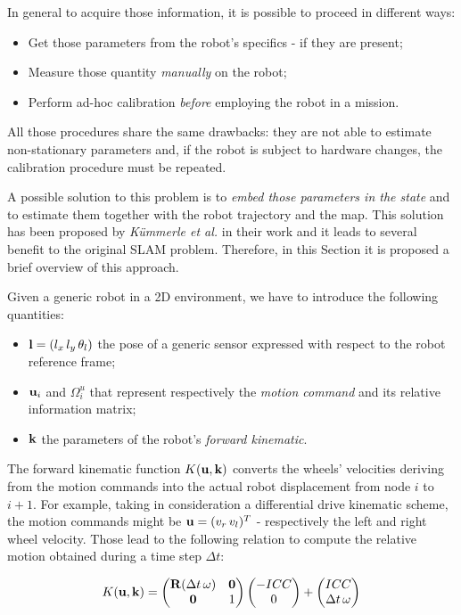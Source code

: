 In general to acquire those information, it is possible to proceed in different ways:

\begin{itemize}
    \item Get those parameters from the robot's specifics - if they are present;
    \item Measure those quantity \textit{manually} on the robot;
    \item Perform ad-hoc calibration \textit{before} employing the robot in a mission.
\end{itemize}

\noindent All those procedures share the same drawbacks: they are not able to estimate non-stationary parameters and, if the robot is subject to hardware changes, the calibration procedure must be repeated. 

A possible solution to this problem is to \textit{embed those parameters in the state} and to estimate  them together with the robot trajectory and the map. This solution has been proposed by \textit{K\"ummerle et al.} in their work \cite{kummerle2011sclam} and it leads to several benefit to the original SLAM problem. Therefore, in this Section it is proposed a brief overview of this approach.

Given a generic robot in a 2D environment, we have to introduce the following quantities:

\begin{itemize}
    \item $\mathbf{l} = (l_x \, l_y \, \theta_l)$ the pose of a generic sensor expressed with respect to the robot reference frame;
    \item $\mathbf{u}_i$ and $\Omega_i^u$ that represent respectively the \textit{motion command} and its relative information matrix;
    \item $\mathbf{k}$ the parameters of the robot's \textit{forward kinematic}.
\end{itemize}

The forward kinematic function $K(\mathbf{u}, \mathbf{k})$ converts the wheels' velocities deriving from the motion commands into the actual robot displacement from node $i$ to $i+1$. For example, taking in consideration a differential drive kinematic scheme, the motion commands might be $\mathbf{u} = (v_r \, v_l)^T$ - respectively the left and right wheel velocity. Those lead to the following relation to compute the relative motion obtained during a time step $\Delta t$:

\begin{equation}
    \label{eq:dd_kinematics}
    K(\mathbf{u}, \mathbf{k}) = 
        \begin{pmatrix}
            \mathbf{R}(\Delta t \, \omega) & \mathbf{0} \\
            \mathbf{0} & 1
        \end{pmatrix}
        \begin{pmatrix}
            -ICC \\ 0
        \end{pmatrix}
        +
        \begin{pmatrix}
            ICC \\ \Delta t \, \omega
        \end{pmatrix}
\end{equation}

